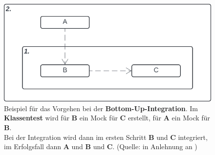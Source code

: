 \begin{figure}
    \centering
    \includegraphics[scale=0.4]{part four/Testende Verfahren/img/bottomup}
    \caption{Beispiel für das Vorgehen bei der \textbf{Bottom-Up-Integration}. Im \textbf{Klassentest} wird für \textbf{B} ein Mock für \textbf{C} erstellt, für \textbf{A} ein Mock für \textbf {B}.\\
    Bei der Integration wird dann im ersten Schritt \textbf{B} und \textbf{C} integriert, im Erfolgsfall dann \textbf{A} und \textbf{B} und \textbf{C}. (Quelle: in Anlehnung an \cite[Abb. 5.5, 60]{Wed09c})}
    \label{fig:bottomup-cc}
\end{figure}